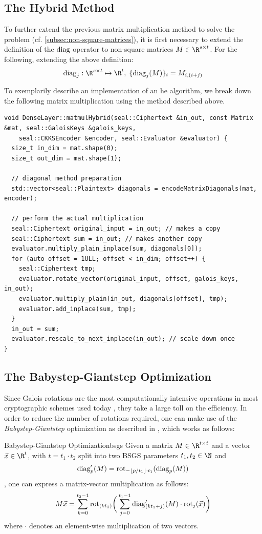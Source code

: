 \subsection{The Hybrid Method}
To further extend the previous matrix multiplication method to solve the problem
(cf. \autoref{subsec:non-square-matrices}), it is first necessary to extend the definition of the $\mathrm{diag}$ operator
to non-square matrices $M \in \R^{s \times t}$.
For the following, extending the above definition:
$$\diag_j: \R^{s \times t} \mapsto \R^t, \; \{\diag_j(M)\}_i = M_{i, (i+j)}$$

To exemplarily describe an implementation of an \gls{he} algorithm, we break down the following
matrix multiplication using the method described above.
\begin{verbatim}
void DenseLayer::matmulHybrid(seal::Ciphertext &in_out, const Matrix &mat, seal::GaloisKeys &galois_keys,
    seal::CKKSEncoder &encoder, seal::Evaluator &evaluator) {
  size_t in_dim = mat.shape(0);
  size_t out_dim = mat.shape(1);

  // diagonal method preparation
  std::vector<seal::Plaintext> diagonals = encodeMatrixDiagonals(mat, encoder);

  // perform the actual multiplication
  seal::Ciphertext original_input = in_out; // makes a copy
  seal::Ciphertext sum = in_out; // makes another copy
  evaluator.multiply_plain_inplace(sum, diagonals[0]);
  for (auto offset = 1ULL; offset < in_dim; offset++) {
    seal::Ciphertext tmp;
    evaluator.rotate_vector(original_input, offset, galois_keys, in_out);
    evaluator.multiply_plain(in_out, diagonals[offset], tmp);
    evaluator.add_inplace(sum, tmp);
  }
  in_out = sum;
  evaluator.rescale_to_next_inplace(in_out); // scale down once
}
\end{verbatim}

\subsection{The Babystep-Giantstep Optimization}
Since Galois rotations are the most computationally intensive operations in most cryptographic schemes used
today \parencite{2021-pasta}, they take a large toll on the efficiency.
In order to reduce the number of rotations required, one can make use of the \textit{Babystep-Giantstep}
optimization as described in \cite{2018-faster-helib}, which works as follows:

\begin{theorem}{Babystep-Giantstep Optimization}{bsgs}
  Given a matrix $M \in \R^{t \times t}$ and a vector $\vec{x} \in \R^t$,
  with $t = t_1 \cdot t_2$ split into two BSGS parameters $t_1, t_2 \in \N$ and
  $$\mathrm{diag}'_p(M) = \mathrm{rot}_{-\lfloor p/t_1 \rfloor \cdot t_1}(\mathrm{diag}_p(M))$$,
  one can express a matrix-vector multiplication as follows:
  \begin{equation}
    M \vec{x} = \sum_{k=0}^{t_2-1} \mathrm{rot}_{(kt_1)} \bigg(
    \sum_{j=0}^{t_1-1} \mathrm{diag}'_{(kt_1+j)}(M) \cdot \mathrm{rot}_j(\vec{x})
    \bigg)
  \end{equation}
  where $\cdot$ denotes an element-wise multiplication of two vectors.
\end{theorem}

